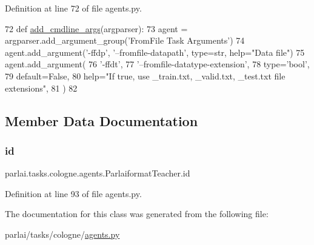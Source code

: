 Definition at line 72 of file agents.\+py.


\begin{DoxyCode}
72     \textcolor{keyword}{def }\hyperlink{namespaceparlai_1_1agents_1_1drqa_1_1config_a62fdd5554f1da6be0cba185271058320}{add\_cmdline\_args}(argparser):
73         agent = argparser.add\_argument\_group(\textcolor{stringliteral}{'FromFile Task Arguments'})
74         agent.add\_argument(\textcolor{stringliteral}{'-ffdp'}, \textcolor{stringliteral}{'--fromfile-datapath'}, type=str, help=\textcolor{stringliteral}{"Data file"})
75         agent.add\_argument(
76             \textcolor{stringliteral}{'-ffdt'},
77             \textcolor{stringliteral}{'--fromfile-datatype-extension'},
78             type=\textcolor{stringliteral}{'bool'},
79             default=\textcolor{keyword}{False},
80             help=\textcolor{stringliteral}{"If true, use \_train.txt, \_valid.txt, \_test.txt file extensions"},
81         )
82 
\end{DoxyCode}


\subsection{Member Data Documentation}
\mbox{\label{classparlai_1_1tasks_1_1cologne_1_1agents_1_1ParlaiformatTeacher_a3dc8423e1360d4027beb36f3b62287c6}} 
\subsubsection{\texorpdfstring{id}{id}}
{\footnotesize\ttfamily parlai.\+tasks.\+cologne.\+agents.\+Parlaiformat\+Teacher.\+id}



Definition at line 93 of file agents.\+py.



The documentation for this class was generated from the following file\+:\begin{DoxyCompactItemize}
\item 
parlai/tasks/cologne/\hyperlink{parlai_2tasks_2cologne_2agents_8py}{agents.\+py}\end{DoxyCompactItemize}
